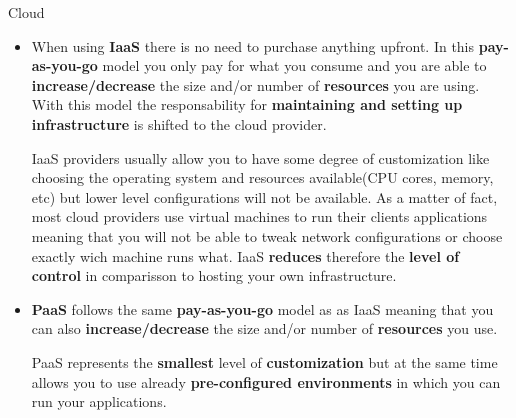 \begin{pattern}{Cloud}
{\begin{itemize}
					On the \textbf{downside}, this options usually means that you \textbf{have to purchase hardware} and that you either \textbf{acquire more resources than what you need} or you risk \textbf{not having enough resources} to answer increasing computing needs. Additionally you will have to \textbf{create} and \textbf{support} a team or department to \textbf{manage the infrastructure}. 

					\item When using \textbf{IaaS} there is no need to purchase anything upfront. In this \textbf{pay-as-you-go} model you only pay for what you consume and you are able to \textbf{increase/decrease} the size and/or number of \textbf{resources} you are using. With this model the responsability for \textbf{maintaining and setting up infrastructure} is shifted to the cloud provider. 

					IaaS providers usually allow you to have some degree of customization  like choosing the operating system and resources available(CPU cores, memory, etc) but lower level configurations will not be available. As a matter of fact, most cloud providers use virtual machines to run their clients applications meaning that you will not be able to tweak network configurations or choose exactly wich machine runs what. IaaS \textbf{reduces} therefore the \textbf{level of control} in comparisson to hosting your own infrastructure.
					
					\item \textbf{PaaS} follows the same \textbf{pay-as-you-go} model as as IaaS meaning that you can also \textbf{increase/decrease} the size and/or number of \textbf{resources} you use. 

					PaaS represents the \textbf{smallest} level of \textbf{customization} but at the same time allows you to use already \textbf{pre-configured environments } in which you can run your applications.


				\end{itemize}
			}
		\end{pattern}



